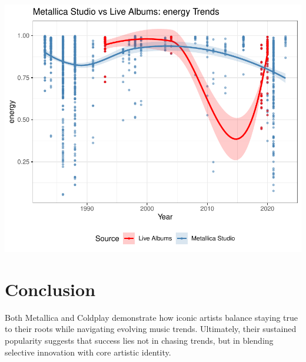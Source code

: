 \documentclass[11pt,preprint]{elsarticle}
\numberwithin{equation}{section}
\numberwithin{figure}{section}
\numberwithin{table}{section}
\begin{document}
\begin{center}\includegraphics[width=0.8\linewidth]{Question2_files/figure-latex/unnamed-chunk-8-2} \end{center}

\section{Conclusion}\label{conclusion}

Both Metallica and Coldplay demonstrate how iconic artists balance
staying true to their roots while navigating evolving music trends.
Ultimately, their sustained popularity suggests that success lies not in
chasing trends, but in blending selective innovation with core artistic
identity.


\end{document}
